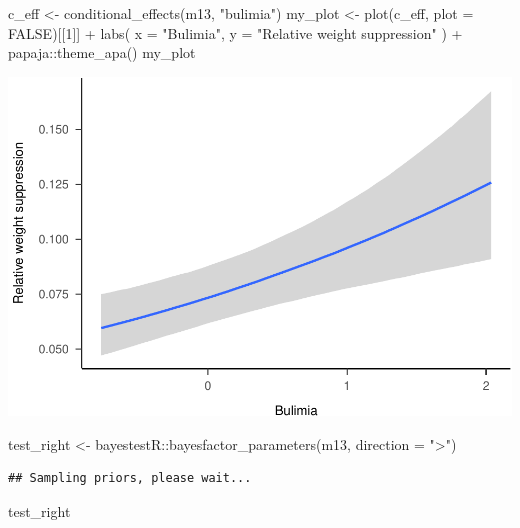 \documentclass[
]{article}
\newenvironment{Shaded}{\begin{snugshade}}{\end{snugshade}}
\newcommand{\AttributeTok}[1]{\textcolor[rgb]{0.77,0.63,0.00}{#1}}
\newcommand{\ConstantTok}[1]{\textcolor[rgb]{0.00,0.00,0.00}{#1}}
\newcommand{\DecValTok}[1]{\textcolor[rgb]{0.00,0.00,0.81}{#1}}
\newcommand{\FunctionTok}[1]{\textcolor[rgb]{0.00,0.00,0.00}{#1}}
\newcommand{\NormalTok}[1]{#1}
\newcommand{\OtherTok}[1]{\textcolor[rgb]{0.56,0.35,0.01}{#1}}
\newcommand{\SpecialCharTok}[1]{\textcolor[rgb]{0.00,0.00,0.00}{#1}}
\newcommand{\StringTok}[1]{\textcolor[rgb]{0.31,0.60,0.02}{#1}}
\begin{document}
\begin{Shaded}
\begin{Highlighting}[]
\NormalTok{c\_eff }\OtherTok{\textless{}{-}} \FunctionTok{conditional\_effects}\NormalTok{(m13, }\StringTok{"bulimia"}\NormalTok{)}
\NormalTok{my\_plot }\OtherTok{\textless{}{-}} \FunctionTok{plot}\NormalTok{(c\_eff, }\AttributeTok{plot =} \ConstantTok{FALSE}\NormalTok{)[[}\DecValTok{1}\NormalTok{]] }\SpecialCharTok{+}
  \FunctionTok{labs}\NormalTok{(}
    \AttributeTok{x =} \StringTok{"Bulimia"}\NormalTok{,}
    \AttributeTok{y =} \StringTok{"Relative weight suppression"}
\NormalTok{  ) }\SpecialCharTok{+}
\NormalTok{  papaja}\SpecialCharTok{::}\FunctionTok{theme\_apa}\NormalTok{()}
\NormalTok{my\_plot}
\end{Highlighting}
\end{Shaded}

\includegraphics{046_weight_history_alpha_files/figure-latex/unnamed-chunk-13-1.pdf}

\begin{Shaded}
\begin{Highlighting}[]
\NormalTok{test\_right }\OtherTok{\textless{}{-}}\NormalTok{ bayestestR}\SpecialCharTok{::}\FunctionTok{bayesfactor\_parameters}\NormalTok{(m13, }\AttributeTok{direction =} \StringTok{"\textgreater{}"}\NormalTok{)}
\end{Highlighting}
\end{Shaded}

\begin{verbatim}
## Sampling priors, please wait...
\end{verbatim}

\begin{Shaded}
\begin{Highlighting}[]
\NormalTok{test\_right}
\end{Highlighting}
\end{Shaded}
\end{document}
